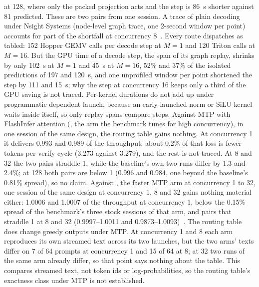 at 128, where only the packed projection acts and the step is 86~\textmu s shorter against 81 predicted. These are two pairs from one session. A trace of plain decoding under Nsight Systems (node-level graph trace, one 2-second window per point) accounts for part of the shortfall at concurrency 8~. Every route dispatches as tabled: 152 Hopper GEMV calls per decode step at $M=1$ and 120 Triton calls at $M=16$. But the GPU time of a decode step, the span of its graph replay, shrinks by only 102~\textmu s at $M=1$ and 45~\textmu s at $M=16$, 52\% and 37\% of the isolated predictions of 197 and 120~\textmu s, and one unprofiled window per point shortened the step by 111 and 15~\textmu s; why the step at concurrency 16 keeps only a third of the GPU saving is not traced. Per-kernel durations do not add up under programmatic dependent launch, because an early-launched norm or SiLU kernel waits inside itself, so only replay spans compare steps. Against MTP with FlashInfer attention (, the arm the benchmark tunes for high concurrency), in one session of the same design, the routing table gains nothing. At concurrency 1 it delivers 0.993 and 0.989 of the throughput; about 0.2\% of that loss is fewer tokens per verify cycle (3.273 against 3.279), and the rest is not traced. At 8 and 32 the two pairs straddle 1, while the baseline's own two runs differ by 1.3 and 2.4\%; at 128 both pairs are below 1 (0.996 and 0.984, one beyond the baseline's 0.81\% spread), so no claim. Against , the faster MTP arm at concurrency 1 to 32, one session of the same design at concurrency 1, 8 and 32 gains nothing material either: 1.0006 and 1.0007 of the throughput at concurrency 1, below the 0.15\% spread of the benchmark's three stock sessions of that arm, and pairs that straddle 1 at 8 and 32 (0.9997--1.0011 and 0.9873--1.0093)~. The routing table does change greedy outputs under MTP. At concurrency 1 and 8 each arm reproduces its own streamed text across its two launches, but the two arms' texts differ on 7 of 64 prompts at concurrency 1 and 15 of 64 at 8; at 32 two runs of the same arm already differ, so that point says nothing about the table. This compares streamed text, not token ids or log-probabilities, so the routing table's exactness class under MTP is not established.

